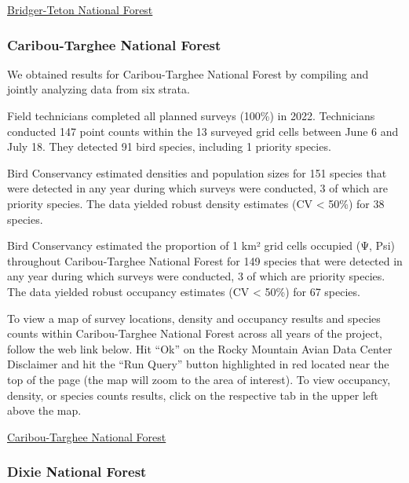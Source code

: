 \documentclass[
  letterpaper,
  DIV=11,
  numbers=noendperiod,
  oneside]{scrreprt}
\begin{document}
\href{http://www.rmbo.org/new_site/adc/QueryWindow.aspx\#N4IgzgrgDgpgTmALnAhoiBbEAuABCAITgEsATAc3gFoAVGRAewDtcA5NY5lAG1wDEGcGEhABfIA=}{Bridger-Teton
National Forest}

\hypertarget{caribou-targhee-national-forest}{%
\subsubsection{Caribou-Targhee National
Forest}\label{caribou-targhee-national-forest}}

We obtained results for Caribou-Targhee National Forest by compiling and
jointly analyzing data from six strata.

Field technicians completed all planned surveys (100\%) in 2022.
Technicians conducted 147 point counts within the 13 surveyed grid cells
between June 6 and July 18. They detected 91 bird species, including 1
priority species.

Bird Conservancy estimated densities and population sizes for 151
species that were detected in any year during which surveys were
conducted, 3 of which are priority species. The data yielded robust
density estimates (CV \textless{} 50\%) for 38 species.

Bird Conservancy estimated the proportion of 1 km² grid cells occupied
(Ψ, Psi) throughout Caribou-Targhee National Forest for 149 species that
were detected in any year during which surveys were conducted, 3 of
which are priority species. The data yielded robust occupancy estimates
(CV \textless{} 50\%) for 67 species.

To view a map of survey locations, density and occupancy results and
species counts within Caribou-Targhee National Forest across all years
of the project, follow the web link below. Hit ``Ok'' on the Rocky
Mountain Avian Data Center Disclaimer and hit the ``Run Query'' button
highlighted in red located near the top of the page (the map will zoom
to the area of interest). To view occupancy, density, or species counts
results, click on the respective tab in the upper left above the map.

\href{http://www.rmbo.org/new_site/adc/QueryWindow.aspx\#N4IgzgrgDgpgTmALnAhoiBbEAuABCAYRTgEsAjAewgFoAVYgcwAsYZcA5NEigOxQBtcAMQpwYSEAF8gA}{Caribou-Targhee
National Forest}

\hypertarget{dixie-national-forest}{%
\subsubsection{Dixie National Forest}\label{dixie-national-forest}}
\end{document}
